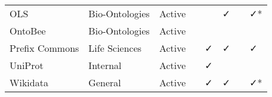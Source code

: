 \begin{table}
\begin{tabular}{llllllll}
            OLS &  Bio-Ontologies &       Active &                           &                        &                              ✓ &                             &                     ✓* \\
        OntoBee &  Bio-Ontologies &       Active &                           &                        &                                &                             &                        \\
 Prefix Commons &   Life Sciences &       Active &                           &                      ✓ &                              ✓ &                             &                      ✓ \\
        UniProt &        Internal &       Active &                           &                      ✓ &                                &                             &                        \\
       Wikidata &         General &       Active &                           &                      ✓ &                              ✓ &                             &                     ✓* \\
\bottomrule
\end{tabular}
\end{table}
